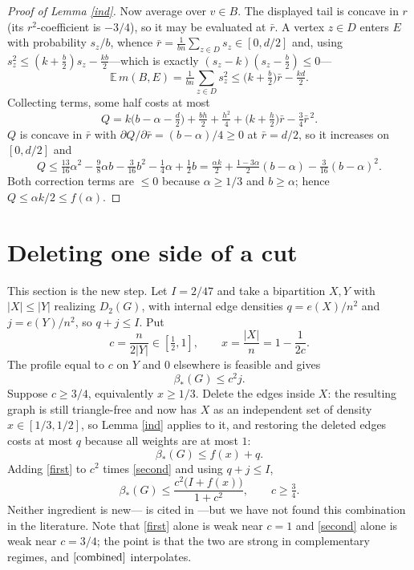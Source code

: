 \documentclass[11pt]{article}
\theoremstyle{remark}
\newcommand{\bh}{\beta_*}
\begin{document}
\begin{proof}[Proof of Lemma \ref{ind}]
Now average over $v\in B$. The displayed tail is concave in $r$ (its
$r^2$-coefficient is $-3/4$), so it may be evaluated at $\bar r$. A vertex
$z\in D$ enters $E$ with probability $s_z/b$, whence
$\bar r=\frac1{bn}\sum_{z\in D}s_z\in[0,d/2]$ and, using
$s_z^2\le(k+\frac b2)s_z-\frac{kb}{2}$---which is exactly
$(s_z-k)(s_z-\frac b2)\le0$---
\[
 \mathbb E\,m(B,E)=\tfrac1{bn}\textstyle\sum_{z\in D}s_z^2
   \le\big(k+\tfrac b2\big)\bar r-\tfrac{kd}{2}.
\]
Collecting terms, some half costs at most
\[
 Q=k\big(b-\alpha-\tfrac d2\big)+\tfrac{bh}{2}+\tfrac{h^2}{4}
   +\big(k+\tfrac h2\big)\bar r-\tfrac34\bar r^{\,2}.
\]
$Q$ is concave in $\bar r$ with $\partial Q/\partial\bar r=(b-\alpha)/4\ge0$ at
$\bar r=d/2$, so it increases on $[0,d/2]$ and
\[
 Q\le\tfrac{13}{16}\alpha^2-\tfrac98\alpha b-\tfrac3{16}b^2-\tfrac14\alpha
     +\tfrac12 b
   =\tfrac{\alpha k}{2}+\tfrac{1-3\alpha}{2}(b-\alpha)
     -\tfrac3{16}(b-\alpha)^2 .
\]
Both correction terms are $\le0$ because $\alpha\ge1/3$ and $b\ge\alpha$;
hence $Q\le\alpha k/2\le f(\alpha)$.
\end{proof}

\section{Deleting one side of a cut}
This section is the new step. Let $I=2/47$ and take a bipartition $X,Y$ with
$|X|\le|Y|$ realizing $D_2(G)$, with internal edge densities $q=e(X)/n^2$ and
$j=e(Y)/n^2$, so $q+j\le I$. Put
\[
 c=\frac{n}{2|Y|}\in[\tfrac12,1],\qquad x=\frac{|X|}{n}=1-\frac1{2c}.
\]
The profile equal to $c$ on $Y$ and $0$ elsewhere is feasible and gives
\begin{equation}\label{first}
 \bh(G)\le c^2 j .
\end{equation}
Suppose $c\ge3/4$, equivalently $x\ge1/3$. Delete the edges inside $X$: the
resulting graph is still triangle-free and now has $X$ as an independent set of
density $x\in[1/3,1/2]$, so Lemma \ref{ind} applies to it, and restoring the
deleted edges costs at most $q$ because all weights are at most $1$:
\begin{equation}\label{second}
 \bh(G)\le f(x)+q .
\end{equation}
Adding \eqref{first} to $c^2$ times \eqref{second} and using $q+j\le I$,
\begin{equation}\label{combined}
 \bh(G)\le\frac{c^2\big(I+f(x)\big)}{1+c^2},\qquad c\ge\tfrac34 .
\end{equation}
Neither ingredient is new---\cite{bcl} is cited in \cite{raz}---but we have
not found this combination in the literature. Note that \eqref{first} alone is
weak near $c=1$ and \eqref{second} alone is weak near $c=3/4$; the point is
that the two are strong in complementary regimes, and $\eqref{combined}$
interpolates.
\end{document}
